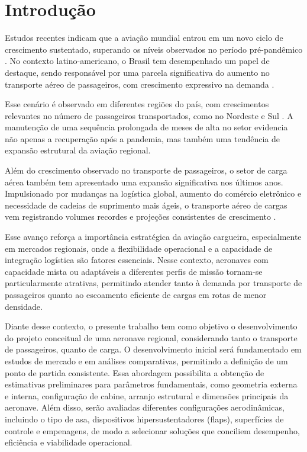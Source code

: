 \chapter{Introdução}

Estudos recentes indicam que a aviação mundial entrou em um novo ciclo de crescimento sustentado, superando os níveis observados no período pré-pandêmico \cite{panrotas2026}. No contexto latino-americano, o Brasil tem desempenhado um papel de destaque, sendo responsável por uma parcela significativa do aumento no transporte aéreo de passageiros, com crescimento expressivo na demanda \cite{aeroin2026, portalin2026}.

Esse cenário é observado em diferentes regiões do país, com crescimentos relevantes no número de passageiros transportados, como no Nordeste e Sul \cite{mercadoeventos2026, r72026}. A manutenção de uma sequência prolongada de meses de alta no setor evidencia não apenas a recuperação após a pandemia, mas também uma tendência de expansão estrutural da aviação regional.

Além do crescimento observado no transporte de passageiros, o setor de carga aérea também tem apresentado uma expansão significativa nos últimos anos. Impulsionado por mudanças na logística global, aumento do comércio eletrônico e necessidade de cadeias de suprimento mais ágeis, o transporte aéreo de cargas vem registrando volumes recordes e projeções consistentes de crescimento \cite{agenciainfra2025, gazetadopovo2026}.

Esse avanço reforça a importância estratégica da aviação cargueira, especialmente em mercados regionais, onde a flexibilidade operacional e a capacidade de integração logística são fatores essenciais. Nesse contexto, aeronaves com capacidade mista ou adaptáveis a diferentes perfis de missão tornam-se particularmente atrativas, permitindo atender tanto à demanda por transporte de passageiros quanto ao escoamento eficiente de cargas em rotas de menor densidade.

Diante desse contexto, o presente trabalho tem como objetivo o desenvolvimento do projeto conceitual de uma aeronave regional, considerando tanto o transporte de passageiros, quanto de carga. O desenvolvimento inicial será fundamentado em estudos de mercado e em análises comparativas, permitindo a definição de um ponto de partida consistente. Essa abordagem possibilita a obtenção de estimativas preliminares para parâmetros fundamentais, como geometria externa e interna, configuração de cabine, arranjo estrutural e dimensões principais da aeronave. Além disso, serão avaliadas diferentes configurações aerodinâmicas, incluindo o tipo de asa, dispositivos hipersustentadores (flaps), superfícies de controle e empenagens, de modo a selecionar soluções que conciliem desempenho, eficiência e viabilidade operacional.

